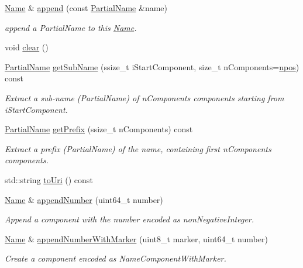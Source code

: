 \begin{DoxyCompactItemize}
\item 
\hyperlink{classndn_1_1Name}{Name} \& \hyperlink{classndn_1_1Name_ad963fb4856c90a3a84eec6dac2adf187}{append} (const \hyperlink{namespacendn_a687f9be727f562d4d77b9b4752e90140}{Partial\+Name} \&name)
\begin{DoxyCompactList}\small\item\em append a Partial\+Name to this \hyperlink{classndn_1_1Name}{Name}. \end{DoxyCompactList}\item 
void \hyperlink{classndn_1_1Name_a7c89caa3dfa5b24d723ce51ae3ff84b2}{clear} ()
\item 
\hyperlink{namespacendn_a687f9be727f562d4d77b9b4752e90140}{Partial\+Name} \hyperlink{classndn_1_1Name_abca74fcd1e4f652f3aa8d99900e7bc1f}{get\+Sub\+Name} (ssize\+\_\+t i\+Start\+Component, size\+\_\+t n\+Components=\hyperlink{classndn_1_1Name_aa53d45ef5e55ed9224b75b4fc99dd692}{npos}) const
\begin{DoxyCompactList}\small\item\em Extract a sub-\/name (Partial\+Name) of {\ttfamily n\+Components} components starting from {\ttfamily i\+Start\+Component}. \end{DoxyCompactList}\item 
\hyperlink{namespacendn_a687f9be727f562d4d77b9b4752e90140}{Partial\+Name} \hyperlink{classndn_1_1Name_a35d7d1b688873fa49bb1c98a04984972}{get\+Prefix} (ssize\+\_\+t n\+Components) const
\begin{DoxyCompactList}\small\item\em Extract a prefix (Partial\+Name) of the name, containing first {\ttfamily n\+Components} components. \end{DoxyCompactList}\item 
std\+::string \hyperlink{classndn_1_1Name_a94c43b5409ab8146754e763345fd67db}{to\+Uri} () const
\item 
\hyperlink{classndn_1_1Name}{Name} \& \hyperlink{classndn_1_1Name_af0e6e26455cd81e2def918f57454fe93}{append\+Number} (uint64\+\_\+t number)
\begin{DoxyCompactList}\small\item\em Append a component with the number encoded as non\+Negative\+Integer. \end{DoxyCompactList}\item 
\hyperlink{classndn_1_1Name}{Name} \& \hyperlink{classndn_1_1Name_a4f03ed1f18787aadf48cc8a869abdd5b}{append\+Number\+With\+Marker} (uint8\+\_\+t marker, uint64\+\_\+t number)
\begin{DoxyCompactList}\small\item\em Create a component encoded as Name\+Component\+With\+Marker. \end{DoxyCompactList}\item 

\end{DoxyCompactItemize}
